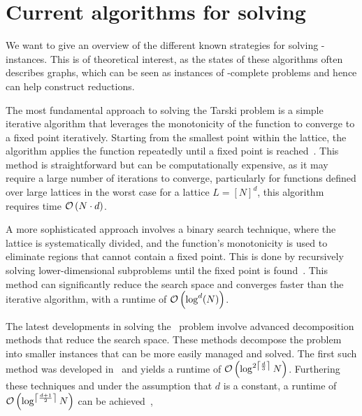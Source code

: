 \section{Current algorithms for solving \Tarski}\label{sec:intro_tarski_algorithms}

We want to give an overview of the different known strategies for solving \Tarski-instances. This is of theoretical interest, as the states of these algorithms often describes graphs, which can be seen as instances of \TFNP-complete problems and hence can help construct reductions.

The most fundamental approach to solving the Tarski problem is a simple iterative algorithm that leverages the monotonicity of the function to converge to a fixed point iteratively. Starting from the smallest point within the lattice, the algorithm applies the function repeatedly until a fixed point is reached~. This method is straightforward but can be computationally expensive, as it may require a large number of iterations to converge, particularly for functions defined over large lattices in the worst case for a lattice $L = {[N]}^d$, this algorithm requires time $\mathcal{O}\left(N \cdot d\right)$.

A more sophisticated approach involves a binary search technique, where the lattice is systematically divided, and the function's monotonicity is used to eliminate regions that cannot contain a fixed point. This is done by recursively solving lower-dimensional subproblems until the fixed point is found~. This method can significantly reduce the search space and converges faster than the iterative algorithm, with a runtime of $\mathcal{O}\left(\log^d(N)\right)$.

The latest developments in solving the \Tarski\ problem involve advanced decomposition methods that reduce the search space. These methods decompose the problem into smaller instances that can be more easily managed and solved. The first such method was developed in~\cite{fearnley_faster_2022} and yields a runtime of $\mathcal{O}\left(\log^{2\left\lceil\frac{d}{3}\right\rceil}{N}\right)$. Furthering these techniques and under the assumption that $d$ is a constant, a runtime of $\mathcal{O}\left(\log^{\left\lceil\frac{d+1}{2}\right\rceil}{N}\right)$ can be achieved~,

